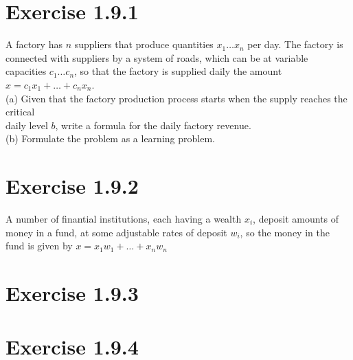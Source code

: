 \documentclass{article}
\begin{document}
\section*{Exercise 1.9.1}


A factory has $n$ suppliers that produce quantities $x_1 \dots x_n$ per day. The factory is connected with suppliers by a system of roads, which
can be at variable capacities $c_1 \dots c_n$, so that the factory is supplied
daily the amount $x = c_1 x_1 + \dots + c_n x_n$.\\
(a) Given that the factory production process starts when the supply reaches the critical \\ 
daily level $b$, write a formula for the daily factory revenue.\\
(b) Formulate the problem as a learning problem.

\section*{Exercise 1.9.2}


A number of finantial institutions, each having a wealth $x_i$, deposit amounts of money in a fund, at some adjustable rates of 
deposit $w_i$, so the money in the fund is given by $x = x_1 w_1 + \dots + x_n w_n$

\section*{Exercise 1.9.3}
\section*{Exercise 1.9.4}
\end{document}
